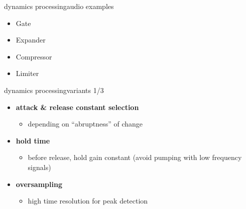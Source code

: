\begin{frame}{dynamics processing}{audio examples}
    \bigskip
    \begin{itemize}
        \item Gate 
        \item Expander 
        \item Compressor 
        \item Limiter 
    \end{itemize}
\end{frame}

\begin{frame}{dynamics processing}{variants 1/3}
	\vspace{-5mm}
    \begin{itemize}
		\item	\textbf{attack \& release constant selection}
			\begin{itemize}
				\item	depending on ``abruptness'' of change
			\end{itemize}
		\pause
        \smallskip
		\item	\textbf{hold time}
			\begin{itemize}
				\item	before release, hold gain constant (avoid pumping with low frequency signals)
			\end{itemize}
		\pause
        \smallskip
		\item	\textbf{oversampling}
			\begin{itemize}
				\item	high time resolution for peak detection
			\end{itemize}
	\end{itemize}
\end{frame}

